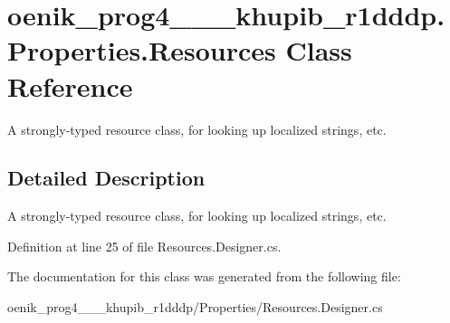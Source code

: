 \hypertarget{classoenik__prog4__2019__1__khupib__r1dddp_1_1_properties_1_1_resources}{}\section{oenik\+\_\+prog4\+\_\+\_\+\_\+khupib\+\_\+r1dddp.\+Properties.\+Resources Class Reference}
\label{classoenik__prog4__2019__1__khupib__r1dddp_1_1_properties_1_1_resources}


A strongly-\/typed resource class, for looking up localized strings, etc.  




\subsection{Detailed Description}
A strongly-\/typed resource class, for looking up localized strings, etc. 



Definition at line 25 of file Resources.\+Designer.\+cs.



The documentation for this class was generated from the following file\+:\begin{DoxyCompactItemize}
\item 
oenik\+\_\+prog4\+\_\+\_\+\_\+khupib\+\_\+r1dddp/\+Properties/Resources.\+Designer.\+cs\end{DoxyCompactItemize}
